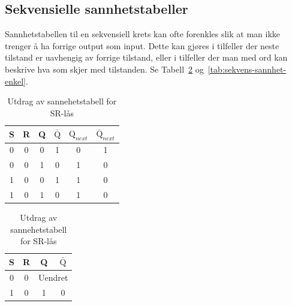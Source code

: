 \documentclass[12pt,a4paper,norsk]{article}
\begin{document}
\subsection{Sekvensielle sannhetstabeller}
Sannhetstabellen til en sekvensiell krets kan ofte forenkles slik at man ikke
trenger å ha forrige output som input. Dette kan gjøres i tilfeller der neste
tilstand er uavhengig av forrige tilstand, eller i tilfeller der man med ord kan
beskrive hva som skjer med tilstanden. Se
Tabell~\ref{tab:sekvens-sannhet-vanskelig} og~\ref{tab:sekvens-sannhet-enkel}.

\begin{table}[hbt!]
  \centering
  \begin{minipage}{0.55\textwidth}
    \centering
    \begin{tabular}{cccc|cc}
      \toprule
      S & R & Q & $\bar{\text{Q}}$ & $\text{Q}_{next}$ & $\bar{\text{Q}}_{next}$ \\
      \midrule
      0 & 0 & 0 & 1 & 0 & 1 \\
      0 & 0 & 1 & 0 & 1 & 0 \\
      \midrule
      1 & 0 & 0 & 1 & 1 & 0 \\
      1 & 0 & 1 & 0 & 1 & 0 \\
      \bottomrule
    \end{tabular}
    \caption{Utdrag av sannehetstabell for SR-lås\label{tab:sekvens-sannhet-vanskelig}}
  \end{minipage}
  \begin{minipage}{.4\textwidth}
    \centering
    \begin{tabular}{cc|cc}
      \toprule
      S & R & Q & $\bar{\text{Q}}$  \\
      \midrule
      0 & 0 & \multicolumn{2}{c}{Uendret} \\
      \midrule
      1 & 0 & 1 & 0 \\
      \bottomrule
    \end{tabular}
  \end{minipage}
\end{table}

\begin{center}
\end{center}
\end{document}
